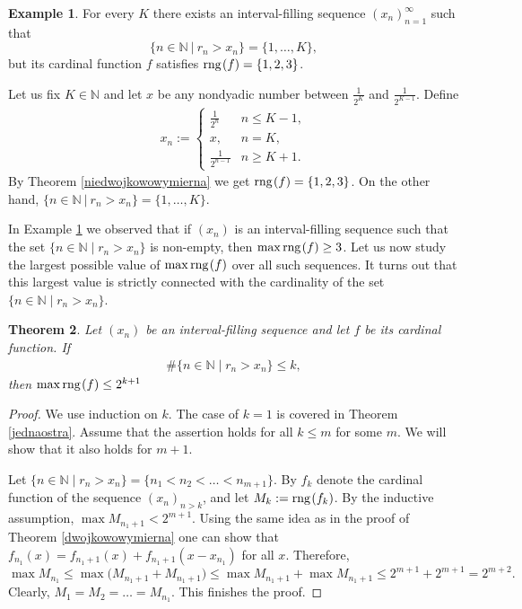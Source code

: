 \documentclass{amsart}
\newtheorem{theorem}{Theorem}[section]
\theoremstyle{definition}
\newtheorem{example}[theorem]{Example}
\newcommand{\rng}{{\rm rng} \hspace{0.03cm}}
\begin{document}
\begin{example}\label{zawszerazdwatrzy}
For every $K$ there exists an interval-filling sequence $(x_{n})_{n=1}^{\infty}$ such that 
$$
\{ n\in\mathbb{N}\ |\ r_n>x_n\}= \{1,\ldots,K\},
$$
but its cardinal function $f$ satisfies $\rng(f)=\{1,2,3\}$.

Let us fix $K\in\mathbb{N}$ and let $x$ be any nondyadic number between $\frac{1}{2^K}$ and $\frac{1}{2^{K-1}}$. Define 
\begin{align*}
x_{n}:=\left\{\begin{array}{ll}
\frac{1}{2^n} & n\leq K-1, \\
x, & n=K, \\
\frac{1}{2^{n-1}} & n\geq K+1 .
\end{array}\right.
\end{align*}
By Theorem \ref{niedwojkowowymierna} we get $\rng(f)=\{1,2,3\}$. On the other hand, $\{ n\in\mathbb{N}\ |\ r_n>x_n\}=\{1,\ldots,K\}$. 
\end{example}

In Example \ref{zawszerazdwatrzy} we observed that if $(x_{n})$ is an interval-filling sequence such that the set $\{n\in\mathbb{N} \mid r_n>x_n\}$ is non-empty, then $\max\rng (f)\geq 3$. Let us now study the largest possible value of $\max\rng (f)$ over all such sequences. It turns out that this largest value is strictly connected with the cardinality of the set $\{n\in\mathbb{N} \mid r_n>x_n\}$.


\begin{theorem}\label{majoranta}
Let $(x_n)$ be an interval-filling sequence and let $f$ be its cardinal function. If 
\begin{align*}
\# \{n\in\mathbb{N} \mid r_n>x_n\} \leq k,
\end{align*}
then $\max \rng (f)\leq 2^{k+1}$
\end{theorem}
\begin{proof}
We use induction on $k$. The case of $k=1$ is covered in Theorem \ref{jednaostra}. Assume that the assertion holds for all $k\leq m$ for some $m$. We will show that it also holds for $m+1$.

Let $\{n\in\mathbb{N} \mid r_n>x_n\}=\{n_1< n_2<\ldots<n_{m+1}\}$. By $f_{k}$ denote the cardinal function of the sequence $(x_{n})_{n>k}$, and let $M_k:=\rng(f_{k})$.
By the inductive assumption, $\max M_{n_1+1}<2^{m+1}$. Using the same idea as in the proof of Theorem \ref{dwojkowowymierna} one can show that $f_{n_1}(x)=f_{n_1+1}(x)+f_{n_1+1}(x-x_{n_{1}})$ for all $x$. Therefore, 
$$
\max M_{n_1}\leq \max\big(M_{n_{1}+1}+M_{n_{1}+1}\big) \leq \max M_{n_{1}+1}+\max M_{n_{1}+1}\leq 2^{m+1}+2^{m+1}=2^{m+2}.
$$  
Clearly, $M_1=M_2=\ldots=M_{n_1}$. This finishes the proof.
\end{proof}
\end{document}
